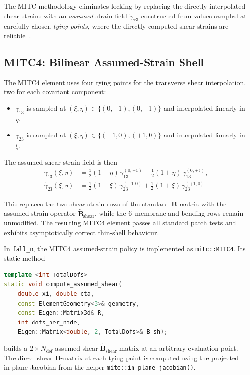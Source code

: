 The MITC methodology eliminates locking by replacing the directly
interpolated shear strains with an \emph{assumed} strain field
$\tilde{\gamma}_{\alpha 3}$ constructed from values sampled at
carefully chosen \emph{tying points}, where the directly computed
shear strains are reliable~\cite{DvorkinBathe1984, BatheDvorkin1986}.

\subsection{MITC4: Bilinear Assumed-Strain Shell}
\label{sec:mitc4}

The MITC4 element uses four tying points for the transverse shear
interpolation, two for each covariant component:

\begin{itemize}
  \item $\gamma_{13}$ is sampled at $(\xi, \eta) \in \{(0, -1), (0, +1)\}$
        and interpolated linearly in~$\eta$.
  \item $\gamma_{23}$ is sampled at $(\xi, \eta) \in \{(-1, 0), (+1, 0)\}$
        and interpolated linearly in~$\xi$.
\end{itemize}

The assumed shear strain field is then
\begin{align}
  \tilde{\gamma}_{13}(\xi, \eta)
  &= \tfrac12(1-\eta)\,\gamma_{13}^{(0,-1)}
   + \tfrac12(1+\eta)\,\gamma_{13}^{(0,+1)}
  ,
  \label{eq:mitc4-g13}
  \\
  \tilde{\gamma}_{23}(\xi, \eta)
  &= \tfrac12(1-\xi)\,\gamma_{23}^{(-1,0)}
   + \tfrac12(1+\xi)\,\gamma_{23}^{(+1,0)}
  .
  \label{eq:mitc4-g23}
\end{align}

This replaces the two shear-strain rows of the standard~$\mathbf{B}$
matrix with the assumed-strain operator
$\tilde{\mathbf{B}}_{\text{shear}}$, while the 6~membrane and
bending rows remain unmodified.  The resulting MITC4 element passes
all standard patch tests and exhibits asymptotically correct thin-shell
behaviour.

In \texttt{fall\_n}, the MITC4 assumed-strain policy is implemented as
\texttt{mitc::MITC4}.  Its static method
\begin{lstlisting}[language=C++, basicstyle=\small\ttfamily]
template <int TotalDofs>
static void compute_assumed_shear(
    double xi, double eta,
    const ElementGeometry<3>& geometry,
    const Eigen::Matrix3d& R,
    int dofs_per_node,
    Eigen::Matrix<double, 2, TotalDofs>& B_sh);
\end{lstlisting}
builds a $2 \times N_\mathrm{dof}$ assumed-shear $\tilde{\mathbf{B}}_\mathrm{shear}$
matrix at an arbitrary evaluation point.  The direct shear
$\mathbf{B}$-matrix at each tying point is computed using the
projected in-plane Jacobian from the helper
\texttt{mitc::in\_plane\_jacobian()}.


